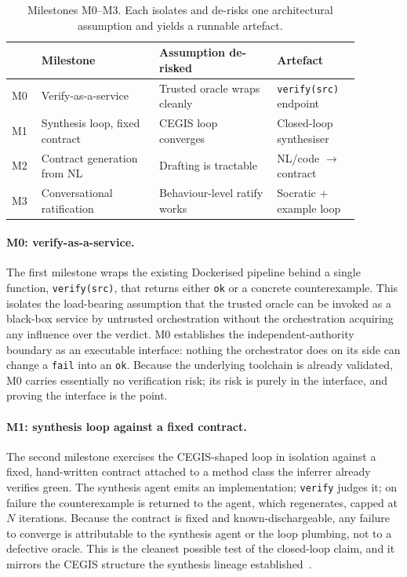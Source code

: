\begin{table}[t]
  \centering
  \caption{Milestones M0--M3. Each isolates and de-risks one architectural assumption and yields a runnable artefact.}
  \label{tab:a5-milestones}
  \begin{tabular}{@{}p{0.07\linewidth}p{0.30\linewidth}p{0.30\linewidth}p{0.21\linewidth}@{}}
    \toprule
    & Milestone & Assumption de-risked & Artefact \\
    \midrule
    M0 & Verify-as-a-service & Trusted oracle wraps cleanly & \texttt{verify(src)} endpoint \\
    M1 & Synthesis loop, fixed contract & CEGIS loop converges & Closed-loop synthesiser \\
    M2 & Contract generation from NL & Drafting is tractable & NL/code $\rightarrow$ contract \\
    M3 & Conversational ratification & Behaviour-level ratify works & Socratic + example loop \\
    \bottomrule
  \end{tabular}
\end{table}

\paragraph{M0: verify-as-a-service.} The first milestone wraps the existing Dockerised pipeline behind a single function, \texttt{verify(src)}, that returns either \texttt{ok} or a concrete counterexample. This isolates the load-bearing assumption that the trusted oracle can be invoked as a black-box service by untrusted orchestration without the orchestration acquiring any influence over the verdict. M0 establishes the independent-authority boundary as an executable interface: nothing the orchestrator does on its side can change a \texttt{fail} into an \texttt{ok}. Because the underlying toolchain is already validated, M0 carries essentially no verification risk; its risk is purely in the interface, and proving the interface is the point.

\paragraph{M1: synthesis loop against a fixed contract.} The second milestone exercises the CEGIS-shaped loop in isolation against a fixed, hand-written contract attached to a method class the inferrer already verifies green. The synthesis agent emits an implementation; \texttt{verify} judges it; on failure the counterexample is returned to the agent, which regenerates, capped at $N$ iterations. Because the contract is fixed and known-dischargeable, any failure to converge is attributable to the synthesis agent or the loop plumbing, not to a defective oracle. This is the cleanest possible test of the closed-loop claim, and it mirrors the CEGIS structure the synthesis lineage established~\cite{solarlezama2008sketching,alur2013sygus}.


